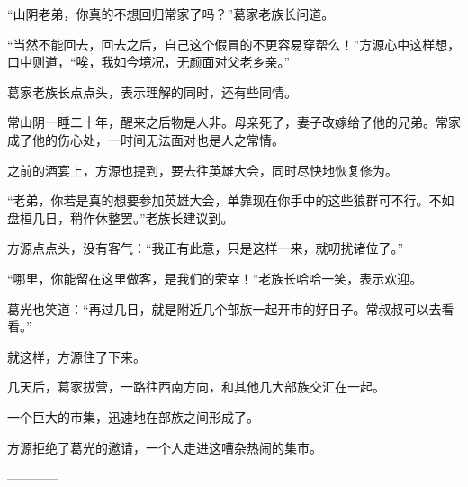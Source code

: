 \begin{this_body}
“山阴老弟，你真的不想回归常家了吗？”葛家老族长问道。

“当然不能回去，回去之后，自己这个假冒的不更容易穿帮么！”方源心中这样想，口中则道，“唉，我如今境况，无颜面对父老乡亲。”

葛家老族长点点头，表示理解的同时，还有些同情。

常山阴一睡二十年，醒来之后物是人非。母亲死了，妻子改嫁给了他的兄弟。常家成了他的伤心处，一时间无法面对也是人之常情。

之前的酒宴上，方源也提到，要去往英雄大会，同时尽快地恢复修为。

“老弟，你若是真的想要参加英雄大会，单靠现在你手中的这些狼群可不行。不如盘桓几日，稍作休整罢。”老族长建议到。

方源点点头，没有客气：“我正有此意，只是这样一来，就叨扰诸位了。”

“哪里，你能留在这里做客，是我们的荣幸！”老族长哈哈一笑，表示欢迎。

葛光也笑道：“再过几日，就是附近几个部族一起开市的好日子。常叔叔可以去看看。”

就这样，方源住了下来。

几天后，葛家拔营，一路往西南方向，和其他几大部族交汇在一起。

一个巨大的市集，迅速地在部族之间形成了。

方源拒绝了葛光的邀请，一个人走进这嘈杂热闹的集市。

------------

\end{this_body}

